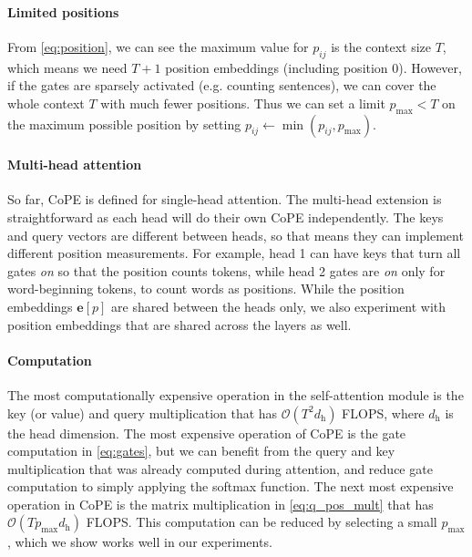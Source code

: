 \documentclass{article}
\newcommand{\ours}{CoPE\xspace}
\renewcommand{\vec}{\mathbf}
\begin{document}
\paragraph{Limited positions}
From \cref{eq:position}, we can see the maximum value for $p_{ij}$ is the context size $T$, which means we need $T+1$ position embeddings (including position 0).
However, if the gates are sparsely activated (e.g. counting sentences), we can cover the whole context $T$ with much fewer positions.
Thus we can set a limit $p_\text{max} < T$ on the maximum possible position by setting
$
p_{ij} \leftarrow \min \left( p_{ij} , p_\text{max} \right)
$.

\paragraph{Multi-head attention}
So far, \ours{} is defined for single-head attention.
The multi-head extension is straightforward as each head will do their own \ours{} independently.
The keys and query vectors are different between heads, so that means they can implement different position measurements.
For example, head 1 can have keys that turn all gates {\em on} so that the position counts tokens, while head 2 gates are {\em on} only for word-beginning tokens, to count words as positions.
While the position embeddings $\vec{e}[p]$ are shared between the heads only, we also experiment with position embeddings that are shared across the layers as well.

\paragraph{Computation}
The most computationally expensive operation in the self-attention module is the key (or value) and query multiplication that has $\mathcal{O}(T^2 d_\text{h})$ FLOPS, where $d_\text{h}$ is the head dimension.
The most expensive operation of \ours{} is the gate computation in \cref{eq:gates}, but we can benefit from the query and key multiplication that was already computed during attention, and reduce gate computation to simply applying the softmax function.
The next most expensive operation in \ours{} is the matrix multiplication in \cref{eq:q_pos_mult} that has $\mathcal{O}(T p_\text{max} d_\text{h})$ FLOPS.
This computation can be reduced by selecting a small $p_\text{max}$, which we show works well in our experiments.
\end{document}
